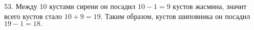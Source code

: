 53. Между 10 кустами сирени он посадил $10-1=9$ кустов жасмина, значит всего кустов стало $10+9=19.$ Таким образом, кустов шиповника он посадил $19-1=18.$\\
